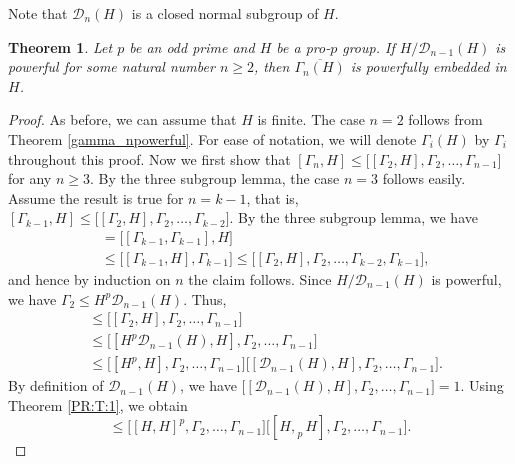 \documentclass[12pt]{elsarticle}
\newtheorem{theorem}{Theorem}[section]
\newtheorem*{main corollary*}{Main Corollary}
\theoremstyle{definition}
\begin{document}
Note that $\mathcal{D}_n(H)$ is a closed normal subgroup of $H$.

\begin{theorem} \label{Gamma_n is powerful}
    Let $p$ be an odd prime and $H$ be a pro-$p$ group. If $H/\mathcal{D}_{n-1}(H)$ is powerful for some natural number $n\geq 2$, then $\overline{\Gamma_n(H)}$ is powerfully embedded in $H$.
\end{theorem}
\begin{proof}
    As before, we can assume that $H$ is finite. The case $n=2$ follows from Theorem \ref{gamma_npowerful}. For ease of notation, we will denote $\Gamma_i(H)$ by $\Gamma_i$ throughout this proof. Now we first show that ${[\Gamma_n,H]\leqslant \bigl[[\Gamma_2,H], \Gamma_2,\ldots, \Gamma_{n-1}\bigr]}$ for any $n\geq 3.$ By the three subgroup lemma, the case $n=3$ follows easily. Assume the result is true for $n=k-1$, that is, $[\Gamma_{k-1},H]\leqslant \bigl[[\Gamma_2,H], \Gamma_2,\ldots, \Gamma_{k-2}\bigr]$. By the three subgroup lemma, we have 
    \begin{align*}
        [\Gamma_k, H]&= \bigl[[\Gamma_{k-1},\Gamma_{k-1}],H\bigr]\\
        &\leqslant \bigl[[\Gamma_{k-1}, H],\Gamma_{k-1}\bigr]\leqslant \bigl[[\Gamma_2,H], \Gamma_2,\ldots, \Gamma_{k-2},\Gamma_{k-1}\bigr],
    \end{align*}and hence by induction on $n$ the claim follows. Since $H/\mathcal{D}_{n-1}(H)$ is powerful, we have $\Gamma_2\leqslant H^p\mathcal{D}_{n-1}(H)$. Thus,
    \begin{align*}
        [\Gamma_n, H]&\leqslant \bigl[[\Gamma_2,H], \Gamma_2,\ldots, \Gamma_{n-1}\bigr]\\
        &\leqslant \bigl[[H^p\mathcal{D}_{n-1}(H),H], \Gamma_2,\ldots, \Gamma_{n-1}\bigr]\\
        &\leqslant \bigl[[H^p,H], \Gamma_2,\ldots, \Gamma_{n-1}\bigr]\bigl[[\mathcal{D}_{n-1}(H),H], \Gamma_2,\ldots, \Gamma_{n-1}\bigr].
    \end{align*}By definition of $\mathcal{D}_{n-1}(H)$, we have $\bigl[[\mathcal{D}_{n-1}(H),H], \Gamma_2,\ldots, \Gamma_{n-1}\bigr]=1$. Using Theorem \ref{PR:T:1}, we obtain 
    \begin{equation}
         [\Gamma_n, H]\leqslant\bigl[[H,H]^p,\Gamma_2,\ldots, \Gamma_{n-1}\bigr]\bigl[[H,_{\;p} H],\Gamma_2,\ldots, \Gamma_{n-1}\bigr].\label{Derived series claim 0}
    \end{equation}
  

\end{proof}
\end{document}
